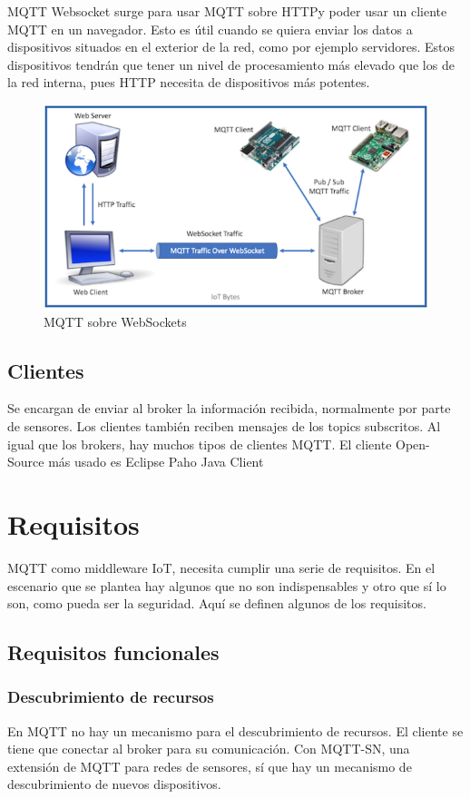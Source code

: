 \documentclass[12pt, twoside]{book}
\begin{document}
MQTT Websocket surge para usar MQTT sobre HTTPy poder usar un cliente MQTT en un navegador. Esto es útil cuando se quiera enviar los datos a dispositivos situados en el exterior de la red, como por ejemplo servidores. Estos dispositivos tendrán que tener un nivel de procesamiento más elevado que los de la red interna, pues HTTP necesita de dispositivos más potentes. 
\begin{figure}[H]
\centering
\includegraphics[scale=0.7]{images/mqtt_over_websockets}
\caption{MQTT sobre WebSockets}\label{L409}
\end{figure}
\subsection*{Clientes}
Se encargan de enviar al broker la información recibida, normalmente por parte de sensores. Los clientes también reciben mensajes de los topics subscritos.
Al igual que los brokers, hay muchos tipos de clientes MQTT. El cliente Open-Source más usado es Eclipse Paho Java Client \cite{paho}
\section{Requisitos}
MQTT como middleware IoT, necesita cumplir una serie de requisitos. En el escenario que se plantea hay algunos que no son indispensables y otro que sí lo son, como pueda ser la seguridad. Aquí se definen algunos de los requisitos.
\subsection{Requisitos funcionales}
\subsubsection*{Descubrimiento de recursos}
En MQTT no hay un mecanismo para el descubrimiento de recursos. El cliente se tiene que conectar al broker para su comunicación. Con MQTT-SN, una extensión de MQTT para redes de sensores, sí que hay un mecanismo de descubrimiento de nuevos dispositivos.
\end{document}
